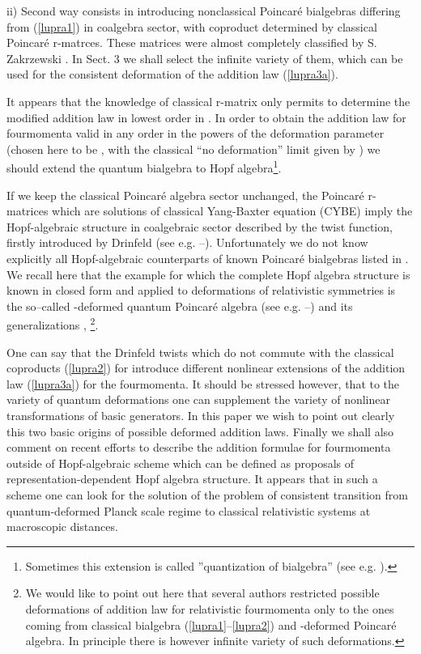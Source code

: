 \documentclass[a4paper,a4paper]{article}
\begin{document}
ii) Second way consists in introducing nonclassical Poincar\'{e}
bialgebras differing from (\ref{lupra1}) in coalgebra sector, with
coproduct determined by classical Poincar\'{e} r-matrces. These
matrices were almost completely classified by S. Zakrzewski
\cite{zak}. In Sect. 3 we shall select the infinite variety of
them, which can be used for the consistent deformation of the
addition law (\ref{lupra3a}).

 It appears that the knowledge of classical
r-matrix only permits to determine the modified addition law in
lowest order in \coordHE{}. In order to    obtain  the
addition law for fourmomenta valid in any order in the powers of
 the deformation parameter (chosen here to be \coordHE{}, 
with
the classical ``no deformation'' limit given by \coordHE{})
we should extend the quantum bialgebra to Hopf
algebra\footnote{Sometimes this extension is called ''quantization
of bialgebra'' (see e.g. \cite{ek}).}.

If we keep the classical Poincar\'{e} algebra sector unchanged,
the Poincar\'{e} r-matrices which are solutions of classical
Yang-Baxter equation (CYBE) imply the Hopf-algebraic structure in
coalgebraic sector described by the twist function, firstly
introduced by Drinfeld (see e.g. \cite{dr2}--\cite{klm}).
Unfortunately we do not know explicitly all Hopf-algebraic
counterparts of known Poincar\'{e} bialgebras listed in
\cite{zak}. We recall here that the example for which the complete
Hopf algebra structure is known in closed form and applied to
deformations of relativistic symmetries is the so--called
\myHighlight{$\kappa$}\coordHE{}-deformed  quantum Poincar\'{e} algebra (see e.g.
\cite{lnt}--\cite{lrz}) and its generalizations \cite{km},
\cite{llm}\footnote{We would like to  point out here that several
authors restricted possible deformations of addition law for
relativistic fourmomenta only to the ones coming from classical
bialgebra (\ref{lupra1}--\ref{lupra2}) and \myHighlight{$\kappa$}\coordHE{}-deformed
Poincar\'{e} algebra. In principle there is however  infinite
variety of such deformations.}.

One can say that the Drinfeld twists which do not commute with the
classical coproducts (\ref{lupra2}) for \coordHE{} introduce
different nonlinear extensions of the addition law (\ref{lupra3a})
for the fourmomenta. It should be stressed however, that to the
variety of quantum deformations one can supplement the variety of
nonlinear transformations of basic generators. In this paper we
wish to point out clearly this two basic origins of possible
deformed addition laws. Finally we shall also comment on recent
efforts to describe the  addition formulae for fourmomenta outside
of Hopf-algebraic scheme which can be defined as proposals of
representation-dependent Hopf algebra structure. It appears that
in such a scheme one can look for the solution of the problem of
consistent transition from quantum-deformed Planck scale regime 
to
classical relativistic systems at macroscopic distances.
\end{document}
